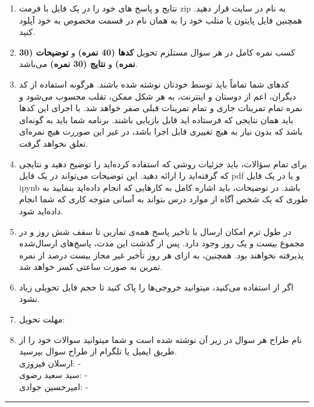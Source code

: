 \documentclass[a4paper]{article}
\begin{document}
\begin{enumerate}
	\item 
نتایج و پاسخ های خود را در یک فایل با فرمت zip به نام
 در سایت  
\href{https://quera.org/course/add_to_course/course/10598/}{} 
 قرار دهید. همچنین فایل پایتون یا متلب خود را به همان نام در قسمت مخصوص به خود آپلود کنید.
\item 
کسب نمره کامل در هر سوال مستلزم تحویل  
\textbf{کدها (40 نمره)}
 و
\textbf{توضیحات (30 نمره)}
و
\textbf{نتایج (30 نمره)}
 می‌باشد. 
\item 
کدهای شما تماماً باید توسط خودتان نوشته شده باشند. هرگونه استفاده از کد دیگران، اعم از دوستان و اینترنت، به هر شکل ممکن، تقلب محسوب می‌شود و نمره تمام تمرینات جاری و تمام تمرینات قبلی صفر خواهد شد. با اجرای این کدها باید همان نتایجی که فرستاده اید قابل بازیابی باشند. برنامه شما باید به گونه‌ای باشد که بدون نیاز به هیچ تغییری قابل اجرا باشد، در غیر این‌ صوررت هیچ نمره‌ای تعلق نخواهد گرفت. 
\item 
برای تمام سؤالات، باید جزئیات روشی که استفاده کرده‌اید را توضیح دهید و نتایجی که گرفته‌اید را ارائه دهید. این توضیحات می‌تواند در یک فایل  pdf  و یا در یک فایل  ipynb باشد. در توضیحات، باید اشاره کامل به کارهایی که انجام داده‌اید بنمایید به طوری که یک شخص آگاه از موارد درس بتواند به آسانی متوجه کاری که شما انجام داده‌اید شود.
\item 
در طول ترم امکان ارسال با تاخیر پاسخ  همه‌ی تمارین تا سقف شش روز و در مجموع بیست و یک روز وجود دارد. پس از گذشت این مدت، پاسخ‌های ارسال‌شده پذیرفته نخواهند بود. همچنین، به ازای هر روز تأخیر غیر مجاز  بیست درصد از نمره تمرین به صورت ساعتی کسر خواهد شد.
\item 
 اگر از
 استفاده می‌کنید، میتوانید خروجی‌ها‌ را پاک کنید تا حجم فایل تحویلی زیاد نشود.
\item 
مهلت تحویل: 
\item 
نام طراح هر سوال در زیر آن نوشته شده است و شما میتوانید سوالات خود را از طریق ایمیل یا تلگرام از طراح سوال بپرسید.
\\
ارسلان فیروزی:
 - 
\\
سید سعید رضوی:
 - 
\\
امیرحسین جوادی:
 - 

\end{enumerate}
\rule[0.1\baselineskip]{\textwidth}{1pt}

\clearpage
\end{document}
